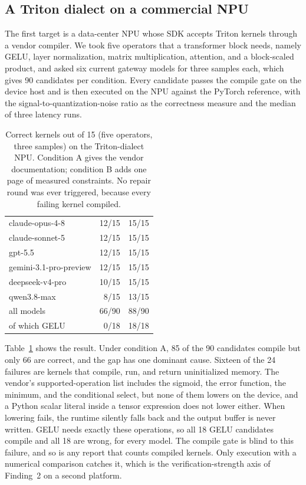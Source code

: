 \subsection{A Triton dialect on a commercial NPU}\label{sec:app-npu-triton}

The first target is a data-center NPU whose SDK accepts Triton kernels through a vendor compiler.
We took five operators that a transformer block needs, namely GELU, layer normalization, matrix
multiplication, attention, and a block-scaled product, and asked six current gateway models for
three samples each, which gives 90 candidates per condition. Every candidate passes the compile gate
on the device host and is then executed on the NPU against the PyTorch reference, with the
signal-to-quantization-noise ratio as the correctness measure and the median of three latency runs.

\begin{table}[t]
\centering
\small
\setlength{\tabcolsep}{6pt}
\caption{Correct kernels out of 15 (five operators, three samples) on the Triton-dialect NPU.
Condition A gives the vendor documentation; condition B adds one page of measured constraints.
No repair round was ever triggered, because every failing kernel compiled.}
\label{tab:app-npu-triton}
\begin{tabular}{@{}lrr@{}}
\toprule
\headrow{Model} & \headrow{A} & \headrow{B} \\
\midrule
claude-opus-4-8        & 12/15 & 15/15 \\
claude-sonnet-5        & 12/15 & 15/15 \\
gpt-5.5                & 12/15 & 15/15 \\
gemini-3.1-pro-preview & 12/15 & 15/15 \\
deepseek-v4-pro        & 10/15 & 15/15 \\
qwen3.8-max            &  8/15 & 13/15 \\
\midrule
all models             & 66/90 & 88/90 \\
\quad of which GELU    &  0/18 & 18/18 \\
\bottomrule
\end{tabular}
\end{table}

Table~\ref{tab:app-npu-triton} shows the result. Under condition A, 85 of the 90 candidates
compile but only 66 are correct, and the gap has one dominant cause. Sixteen of the 24 failures are
kernels that compile, run, and return uninitialized memory. The vendor's supported-operation list
includes the sigmoid, the error function, the minimum, and the conditional select, but none of them
lowers on the device, and a Python scalar literal inside a tensor expression does not lower either.
When lowering fails, the runtime silently falls back and the output buffer is never written. GELU
needs exactly these operations, so all 18 GELU candidates compile and all 18 are wrong, for every
model. The compile gate is blind to this failure, and so is any report that counts compiled kernels.
Only execution with a numerical comparison catches it, which is the verification-strength axis of
Finding~2 on a second platform.

